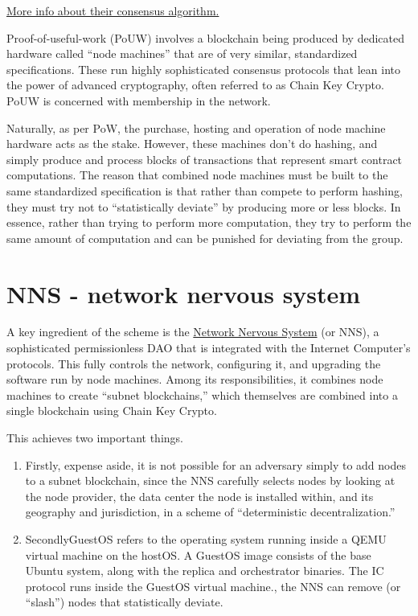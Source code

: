 \href{https://wiki.internetcomputer.org/wiki/Proof_of_Useful_Work}{More info about their consensus algorithm.}

Proof-of-useful-work (PoUW) involves a blockchain being produced by dedicated hardware called ``node machines'' that are of very 
similar, standardized specifications. These run highly sophisticated consensus protocols that lean into the power of advanced 
cryptography, often referred to as Chain Key Crypto. PoUW is concerned with membership in the network.

Naturally, as per PoW, the purchase, hosting and operation of node machine hardware acts as the stake. However, these machines don't 
do hashing, and simply produce and process blocks of transactions that represent smart contract computations. The reason that 
combined node machines must be built to the same standardized specification is that rather than compete to perform hashing, they must 
try not to ``statistically deviate'' by producing more or less blocks. In essence, rather than trying to perform more computation, 
they try to perform the same amount of computation and can be punished for deviating from the group.

\section{NNS - network nervous system}

A key ingredient of the scheme is the \href{https://wiki.internetcomputer.org/wiki/Network_Nervous_System}{Network Nervous System} (or NNS), a sophisticated permissionless DAO that is integrated with the Internet Computer's protocols. This fully controls the network, configuring it, and upgrading the software run by node machines. Among its responsibilities, it combines node machines to create ``subnet blockchains,'' which themselves are combined into a single blockchain using Chain Key Crypto.

This achieves two important things.

\begin{enumerate}
  \item Firstly, expense aside, it is not possible for an adversary simply to add nodes to a subnet blockchain, since the NNS carefully selects nodes by looking at the node provider, the data center the node is installed within, and its geography and jurisdiction, in a scheme of ``deterministic decentralization.''
  \item SecondlyGuestOS refers to the operating system running inside a QEMU virtual machine on the hostOS. A GuestOS image consists of the base Ubuntu system, along with the replica and orchestrator binaries. The IC protocol runs inside the GuestOS virtual machine., the NNS can remove (or ``slash'') nodes that statistically deviate.
\end{enumerate}

